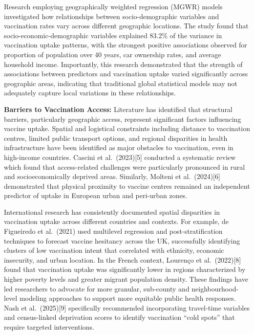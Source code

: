 \documentclass{article}
\begin{document}
Research employing geographically weighted regression (MGWR) models
investigated how relationships between socio-demographic variables and
vaccination rates vary across different geographic locations. The study
found that socio-economic-demographic variables explained 83.2\% of the
variance in vaccination uptake patterns, with the strongest positive
associations observed for proportion of population over 40 years, car
ownership rates, and average household income. Importantly, this
research demonstrated that the strength of associations between
predictors and vaccination uptake varied significantly across geographic
areas, indicating that traditional global statistical models may not
adequately capture local variations in these relationships.

\textbf{Barriers to Vaccination Access:} Literature has identified that
structural barriers, particularly geographic access, represent
significant factors influencing vaccine uptake. Spatial and logistical
constraints including distance to vaccination centres, limited public
transport options, and regional disparities in health infrastructure
have been identified as major obstacles to vaccination, even in
high-income countries. Cascini et al.~(2023){[}5{]} conducted a
systematic review which found that access-related challenges were
particularly pronounced in rural and socioeconomically deprived areas.
Similarly, Molteni et al.~(2024){[}6{]} demonstrated that physical
proximity to vaccine centres remained an independent predictor of uptake
in European urban and peri-urban zones.

International research has consistently documented spatial disparities
in vaccination uptake across different countries and contexts. For
example, de Figueiredo et al.~(2021) used multilevel regression and
post-stratification techniques to forecast vaccine hesitancy across the
UK, successfully identifying clusters of low vaccination intent that
correlated with ethnicity, economic insecurity, and urban location. In
the French context, Lourenço et al.~(2022){[}8{]} found that vaccination
uptake was significantly lower in regions characterized by higher
poverty levels and greater migrant population density. These findings
have led researchers to advocate for more granular, sub-county and
neighbourhood-level modeling approaches to support more equitable public
health responses. Nash et al.~(2025){[}9{]} specifically recommended
incorporating travel-time variables and census-linked deprivation scores
to identify vaccination ``cold spots'' that require targeted
interventions.
\end{document}
